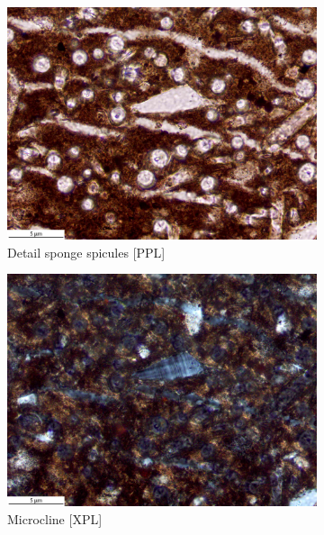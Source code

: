 \documentclass[a4paper]{article}
\begin{document}
\begin{figure}[H]
	\begin{subfigure}[t]{.49\textwidth}
		\includegraphics[width=\textwidth]{ThinSections/110-3_40x_PPL.jpg}
		\caption{Detail sponge spicules [PPL]}
	\end{subfigure}\hspace{.5em}\hfill
	\begin{subfigure}[t]{.49\textwidth}
		\includegraphics[width=\textwidth]{ThinSections/110-3_40x_XPL.jpg}
		\caption{Microcline [XPL]}
	\end{subfigure}
	\caption{}
	\label{fig:110_mun}
\end{figure}
\end{document}
